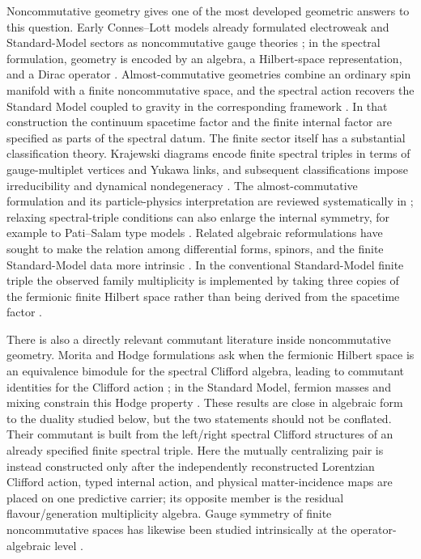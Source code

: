 \documentclass[11pt]{article}
\theoremstyle{definition}
\theoremstyle{remark}
\begin{document}
Noncommutative geometry gives one of the most developed geometric answers to
this question.  Early Connes--Lott models already formulated electroweak and
Standard-Model sectors as noncommutative gauge theories
\cite{ConnesLott1991}; in the spectral formulation, geometry is encoded by an
algebra, a Hilbert-space representation, and a Dirac operator
\cite{Connes1994,ConnesReality1995}.  Almost-commutative geometries combine an
ordinary spin manifold with a finite noncommutative space, and the spectral
action recovers the Standard Model coupled to gravity in the corresponding
framework
\cite{ConnesGravityMatter1996,ChamseddineConnes1997,
ChamseddineConnesMarcolli2007,ChamseddineConnes2008,vanSuijlekom2025}.
In that construction the continuum spacetime factor and the finite internal
factor are specified as parts of the spectral datum.  The finite sector itself
has a substantial classification theory.  Krajewski diagrams encode finite
spectral triples in terms of gauge-multiplet vertices and Yukawa links, and
subsequent classifications impose irreducibility and dynamical
nondegeneracy \cite{Krajewski1998,IochumSchuckerStephan2004}.  The
almost-commutative formulation and its particle-physics interpretation are
reviewed systematically in \cite{vanDenDungenVanSuijlekom2012,vanSuijlekom2025};
relaxing spectral-triple conditions can also enlarge the internal symmetry,
for example to Pati--Salam type models
\cite{ChamseddineConnesVanSuijlekom2013}.  Related algebraic reformulations
have sought to make the relation among differential forms, spinors, and the
finite Standard-Model data more intrinsic \cite{BoyleFarnsworth2018}.  In the
conventional Standard-Model finite triple the observed family multiplicity is
implemented by taking three copies of the fermionic finite Hilbert space rather
than being derived from the spacetime factor
\cite{vanDenDungenVanSuijlekom2012,vanSuijlekom2025}.

There is also a directly relevant commutant literature inside noncommutative
geometry.  Morita and Hodge formulations ask when the fermionic Hilbert space
is an equivalence bimodule for the spectral Clifford algebra, leading to
commutant identities for the Clifford action
\cite{DAndreaDabrowski2016,DabrowskiDAndreaSitarz2018}; in the Standard Model,
fermion masses and mixing constrain this Hodge property
\cite{DabrowskiSitarz2019}.  These results are close in algebraic form to the
duality studied below, but the two statements should not be conflated.  Their
commutant is built from the left/right spectral Clifford structures of an
already specified finite spectral triple.  Here the mutually centralizing pair
is instead constructed only after the independently reconstructed Lorentzian
Clifford action, typed internal action, and physical matter-incidence maps are
placed on one predictive carrier; its opposite member is the residual
flavour/generation multiplicity algebra.  Gauge symmetry of finite
noncommutative spaces has likewise been studied intrinsically at the
operator-algebraic level \cite{BhowmickEtAl2014}.
\end{document}
